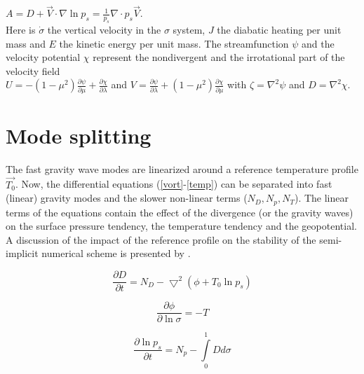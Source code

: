 $A=D+\vec{V} \cdot \nabla \ln p_s 
= \frac{1}{p_s} \nabla \cdot  p_s  \vec{V}$.\\


Here is $\dot{\sigma}$ the 
vertical velocity in the $\sigma$ system, $J$ the diabatic heating 
per unit mass and $E$  
the kinetic energy per unit mass.
The streamfunction $\psi$ and the velocity potential $\chi$ represent the 
nondivergent and the irrotational part of the velocity field\\
${\displaystyle U = -(1-\mu^2) \frac{\partial \psi}{\partial \mu} + \frac{\partial \chi}{\partial \lambda}}$
and 
${\displaystyle V = \frac{\partial \psi}{\partial \lambda} + (1-\mu^2) \frac{\partial \chi}{\partial \mu}}$
with $ \zeta = \nabla^2 \psi $ 
and 
$ D =  \nabla^2 \chi $.


\section{Mode splitting \label{Mode}}


The fast gravity wave modes are linearized around
a reference temperature profile $\vec{T_0}$.
Now, the differential equations (\ref{vort}-\ref{temp}) can be separated into 
fast (linear) gravity modes and
the slower non-linear terms ($N_D, N_p, N_T $).  
The linear terms of the equations contain the effect of the 
divergence (or the gravity waves) on 
the surface pressure tendency, the temperature tendency and the
geopotential.
A discussion of the impact of the reference profile
on the stability of the semi-implicit numerical scheme is
presented by \cite{simmons1978}.

\begin{equation}
{\displaystyle\frac{ \partial  D }{\partial t}= 
{ N_D} - \bigtriangledown^2 (\phi + T_0 \ln p_s)}\label{Mdiv}
\end{equation}


\begin{equation}
{\displaystyle \frac{\partial \phi}{\partial \ln \sigma} = - T}\label{Mhydro}
\end{equation}

\begin{equation}
{\displaystyle \frac{\partial \ln p_s}{\partial t} 
= N_p - \int\limits_{0}^{1} D d \sigma}\label{Mkonti}
\end{equation}


